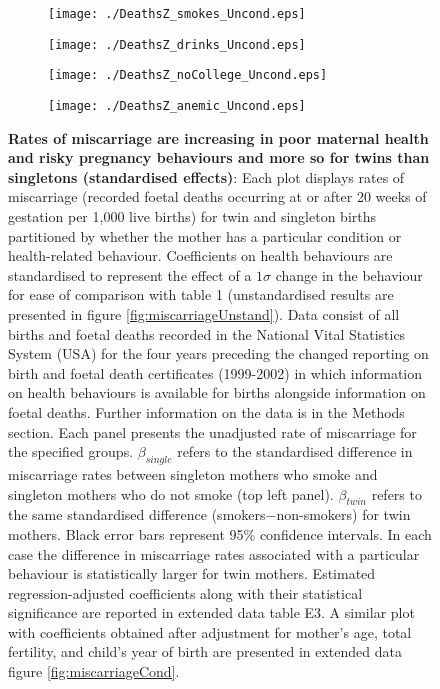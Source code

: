\documentclass{nature}
\begin{document}
\begin{linenumbers}
\begin{spacing}{1}
\begin{figure}[htpb!]
\begin{subfigure}{.5\textwidth}
  \texttt{[image: ./DeathsZ\_smokes\_Uncond.eps]}
\end{subfigure}%
\begin{subfigure}{.5\textwidth}
  \texttt{[image: ./DeathsZ\_drinks\_Uncond.eps]}
\end{subfigure}
\begin{subfigure}{.5\textwidth}
  \texttt{[image: ./DeathsZ\_noCollege\_Uncond.eps]}
\end{subfigure}%
\begin{subfigure}{.5\textwidth}
  \texttt{[image: ./DeathsZ\_anemic\_Uncond.eps]}
\end{subfigure}
\vspace{5mm}
\caption{\textbf{Rates of miscarriage are increasing in poor maternal health and risky pregnancy behaviours and more so for twins than singletons (standardised effects)}: {\footnotesize Each plot displays rates of miscarriage (recorded foetal deaths occurring at or after 20 weeks of gestation per 1,000 live births) for twin and singleton births partitioned by whether the mother has a particular condition or health-related behaviour. Coefficients on health behaviours are standardised to represent the effect of a $1\sigma$ change in the behaviour for ease of comparison with table 1 (unstandardised results are presented in figure \ref{fig:miscarriageUnstand}). Data consist of all births and foetal deaths recorded in the National Vital Statistics System (USA) for the four years preceding the changed reporting on birth and foetal death certificates (1999-2002) in which information on health behaviours is available for births alongside information on foetal deaths. Further information on the data is in the Methods section. Each panel presents the unadjusted rate of miscarriage for the specified groups. $\beta_{single}$ refers to the standardised difference in miscarriage rates between singleton mothers who smoke and singleton mothers who do not smoke (top left panel). $\beta_{twin}$ refers to the same standardised difference (smokers$-$non-smokers) for twin mothers.  Black error bars represent 95\% confidence intervals. In each case the difference in miscarriage rates associated with a particular behaviour is statistically larger for twin mothers.  Estimated regression-adjusted coefficients along with their statistical significance are reported in extended data table E3. A similar plot with coefficients obtained after adjustment for mother's age, total fertility, and child's year of birth are presented in extended data figure \ref{fig:miscarriageCond}.}}
\label{fig:mech}
\end{figure}
\end{spacing}



\end{linenumbers}
\end{document}
